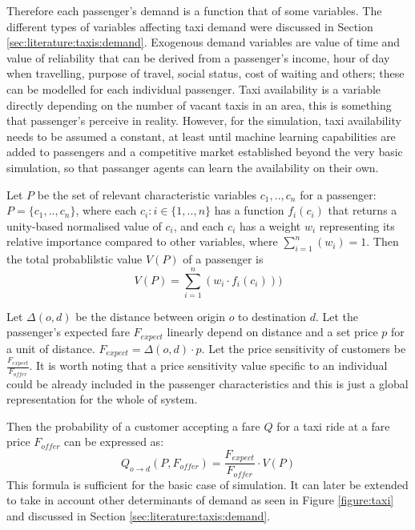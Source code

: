 Therefore each passenger's demand is a function that of some variables. The
different types of variables affecting taxi demand were discussed in Section
\ref{sec:literature:taxis:demand}. Exogenous demand variables are value of time
and value of reliability that can be derived from a passenger's income, hour of
day when travelling, purpose of travel, social status, cost of waiting and
others; these can be modelled for each individual passenger. Taxi availability
is a variable directly depending on the number of vacant taxis in an area, this
is something that passenger's perceive in reality. However, for the simulation,
taxi availability needs to be assumed a constant, at least until machine
learning capabilities are added to passengers and a competitive market
established beyond the very basic simulation, so that passanger agents can
learn the availability on their own.

Let \(P\) be the set of relevant characteristic variables \(c_1,..,c_n\) for a
passenger: \(P = \{c_1,..,c_n\}\), \newline
where each \(c_i : i \in \{1, .., n\}\) has a function \(f_i (c_i) \) that
returns a unity-based normalised value of \(c_i\), \newline
and each \(c_i\) has a weight \(w_i\) representing its relative importance
compared to other variables, where \(\sum_{i=1}^n (w_i) = 1 \). \newline
Then the total probablilstic value \(V(P)\) of a passenger is \[ V(P) =
\sum_{i=1}^{n} (w_i \cdot f_i(c_i) )) \] \newline

Let \(\Delta(o,d)\) be the distance between origin \(o\) to destination \(d\). 
\newline
Let the passenger's expected fare \(F_{expect}\) linearly depend on distance
and a set price \(p\) for a unit of distance. \(F_{expect} = \Delta(o,d) \cdot
p \). \newline
Let the price sensitivity of customers be \(\frac{F_{expect}}{F_{offer}}\). It
is worth noting that a price sensitivity value specific to an individual could
be already included in the passenger characteristics and this is just a global
representation for the whole of system. \newline

Then the probability of a customer accepting a fare \(Q\) for a taxi ride at a
fare price \(F_{offer}\) can be expressed as: 
\begin{equation} 
  \label{eq:design:demand}
  Q_{o \rightarrow d} (P,F_{offer}) = \frac{F_{expect}}{F_{offer}} \cdot V(P)
\end{equation}
This formula is sufficient for the basic case of simulation. It can later be
extended to take in account other determinants of demand as seen in Figure
\ref{figure:taxi} and discussed in Section \ref{sec:literature:taxis:demand}.

